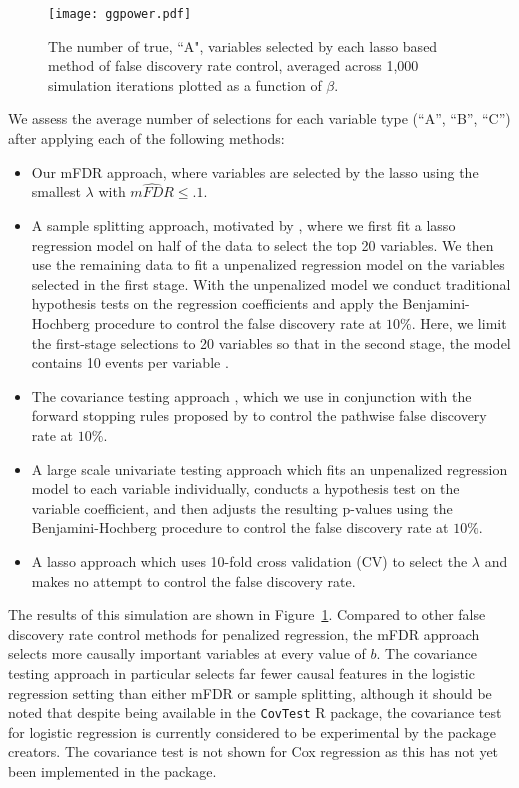 
\begin{figure} [b!]
 \centering
  \texttt{[image: ggpower.pdf]}
  \caption{\label{Fig:lassopower} The number of true, ``A", variables selected by each lasso based method of false discovery rate control, averaged across 1,000 simulation iterations plotted as a function of $\beta$.}
\end{figure}

We assess the average number of selections for each variable type (``A'', ``B'', ``C'') after applying each of the following methods:
\begin{itemize}
\item Our mFDR approach, where variables are selected by the lasso using the smallest $\lambda$ with $\widehat{mFDR} \leq .1$.
\item A sample splitting approach, motivated by \citet{Sample_Splitting}, where we first fit a lasso regression model on half of the data to select the top 20 variables. We then use the remaining data to fit a unpenalized regression model on the variables selected in the first stage. With the unpenalized model we conduct traditional hypothesis tests on the regression coefficients and apply the Benjamini-Hochberg procedure \citep{BH_1995} to control the false discovery rate at $10\%$. Here, we limit the first-stage selections to 20 variables so that in the second stage, the model contains 10 events per variable \citep{peduzzi_epv}.
\item The covariance testing approach \citep{CovTest}, which we use in conjunction with the forward stopping rules proposed by \citet{GSell2016} to control the pathwise false discovery rate at $10\%$. 
\item A large scale univariate testing approach which fits an unpenalized regression model to each variable individually, conducts a hypothesis test on the variable coefficient, and then adjusts the resulting p-values using the Benjamini-Hochberg procedure to control the false discovery rate at $10\%$.
\item A lasso approach which uses 10-fold cross validation (CV) to select the $\lambda$ and makes no attempt to control the false discovery rate.
\end{itemize}

The results of this simulation are shown in Figure~\ref{Fig:lassopower}.  Compared to other false discovery rate control methods for penalized regression, the mFDR approach selects more causally important variables at every value of $b$. The covariance testing approach in particular selects far fewer causal features in the logistic regression setting than either mFDR or sample splitting, although it should be noted that despite being available in the {\tt CovTest} R package, the covariance test for logistic regression is currently considered to be experimental by the package creators.  The covariance test is not shown for Cox regression as this has not yet been implemented in the package.

